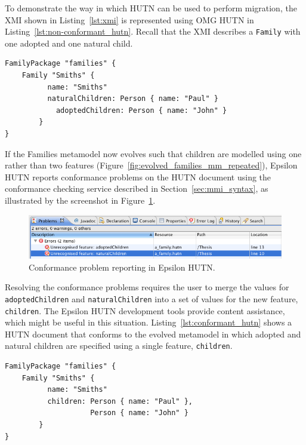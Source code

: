 To demonstrate the way in which HUTN can be used to perform migration, the XMI shown in Listing~\ref{lst:xmi} is represented using OMG HUTN in Listing~\ref{lst:non-conformant_hutn}. Recall that the XMI describes a \texttt{Fa\-mi\-ly} with one adopted and one natural child.

\begin{lstlisting}[caption=OMG HUTN for people with mothers and fathers., label=lst:non-conformant_hutn, language=HutnFamilies]
FamilyPackage "families" {
    Family "Smiths" {
	      name: "Smiths"
	      naturalChildren: Person { name: "Paul" }
		    adoptedChildren: Person { name: "John" }
		}
}
\end{lstlisting}

If the Families metamodel now evolves such that children are modelled using one rather than two features (Figure~\ref{fig:evolved_families_mm_repeated}), Epsilon HUTN reports conformance problems on the HUTN document using the conformance checking service described in Section~\ref{sec:mmi_syntax}, as illustrated by the screenshot in Figure~\ref{fig:hutn_conformance_reporting}.

\begin{figure}[htbp]
  \begin{center}
    \leavevmode
    \includegraphics[scale=0.44]{5.Implementation/hutn_conformance_reporting.png}
  \end{center}
  \caption{Conformance problem reporting in Epsilon HUTN.}
  \label{fig:hutn_conformance_reporting}
\end{figure}

Resolving the conformance problems requires the user to merge the values for \texttt{ad\-op\-t\-edCh\-il\-dr\-en} and \texttt{na\-tu\-ralCh\-il\-dr\-en} into a set of values for the new feature, \texttt{ch\-il\-dr\-en}. The Epsilon HUTN development tools provide content assistance, which might be useful in this situation. Listing~\ref{lst:conformant_hutn} shows a HUTN document that conforms to the evolved metamodel in which adopted and natural children are specified using a single feature, \texttt{ch\-il\-dr\-en}.

\begin{lstlisting}[caption=HUTN for people with parents., label=lst:conformant_hutn, language=HutnFamilies]
FamilyPackage "families" {
    Family "Smiths" {
	      name: "Smiths"
	      children: Person { name: "Paul" },
                    Person { name: "John" }
		}
}
\end{lstlisting}

